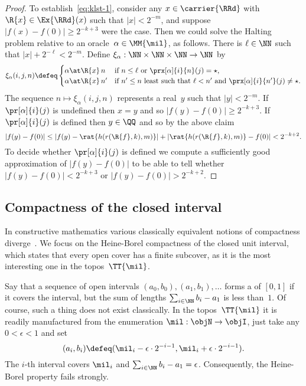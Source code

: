 \begin{proof}
  To establish~\eqref{eq:klst-1}, consider any $x \in \carrier{\RRd}$ with $\R{x} \in \Ex{\RRd}(x)$ such that $|x| < 2^{-m}$,
  and suppose $|f(x) - f(0)| \geq 2^{-k + 3}$ were the case. Then we could solve the Halting problem relative to an oracle~$\alpha \in \MM{\mil}$, as follows. There is $\ell \in \NN$ such that $|x| + 2^{-\ell} < 2^{-m}$. Define $\xi_\alpha : \NN \times \NN \times \NN \to \NN$ by
  \begin{equation*}
    \xi_\alpha(i, j, n) \defeq
    \begin{cases}
      \alpha \at \R{x} \, n  &\text{if $n \leq \ell$ or $\prx[\alpha]{i}{n}(j) = \star$,} \\
      \alpha \at \R{x} \, n' &\text{if $n' \leq n$ least such that $\ell < n'$ and $\prx[\alpha]{i}{n'}(j) \neq \star$.}
    \end{cases}
  \end{equation*}
  The sequence $n \mapsto \xi_\alpha(i, j, n)$ represents a real~$y$ such that $|y| < 2^{-m}$.
  If $\pr[\alpha]{i}(j)$ is undefined then $x = y$ and so $|f(y) - f(0)| \geq 2^{-k+3}$.
  If $\pr[\alpha]{i}(j)$ is defined then $y \in \QQ$ and so by the above claim
  \begin{equation*}
    |f(y) - f(0)| \le |f(y) - \rat{h(r(\R{f}, k), m)}| + |\rat{h(r(\R{f}, k), m)} - f(0)| < 2^{-k+2}.
  \end{equation*}
  To decide whether $\pr[\alpha]{i}(j)$ is defined we compute a sufficiently good approximation of $|f(y) - f(0)|$ to be able to tell whether $|f(y) - f(0)| < 2^{-k+3}$ or $|f(y) - f(0)| > 2^{-k+2}$.
\end{proof}


\subsection{Compactness of the closed interval}
\label{sec:comp-clos-interv}
%
In constructive mathematics various classically equivalent notions of compactness diverge~\cite{bridges02:_compac_contin_const_revis}.
%
We focus on the Heine-Borel compactness of the closed unit interval, which states that every open cover has a finite subcover, as it is the most interesting one in the topos~$\TT{\mil}$.

Say that a sequence of open intervals $(a_0, b_0), (a_1, b_1), \ldots$ forms a  of $[0,1]$ if it covers the interval, but the sum of lengths $\sum_{i \in \NN} b_i - a_1$ is less than~$1$. 
%
Of course, such a thing does not exist classically. In the topos~$\TT{\mil}$ it is readily manufactured from the enumeration $\mil : \objN \to \objI$, just take any $0 < \epsilon < 1$ and set
%
\begin{equation*}
  (a_i, b_i) \defeq (\mil_i - \epsilon \cdot 2^{-i-1}, \mil_i + \epsilon \cdot 2^{-i-1}).
\end{equation*}
%
The $i$-th interval covers $\mil_i$ and $\sum_{i \in \NN} b_i - a_1 = \epsilon$.
Consequently, the Heine-Borel property fails strongly.

